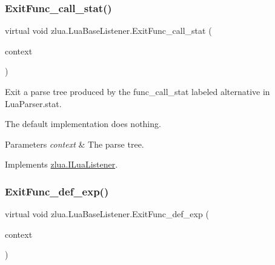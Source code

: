 \subsubsection{\texorpdfstring{Exit\+Func\+\_\+call\+\_\+stat()}{ExitFunc\_call\_stat()}}
{\footnotesize\ttfamily virtual void zlua.\+Lua\+Base\+Listener.\+Exit\+Func\+\_\+call\+\_\+stat (\begin{DoxyParamCaption}\item[{\mbox{[}\+Not\+Null\mbox{]} \mbox{\hyperlink{classzlua_1_1_lua_parser_1_1_func__call__stat_context}{Lua\+Parser.\+Func\+\_\+call\+\_\+stat\+Context}}}]{context }\end{DoxyParamCaption})\hspace{0.3cm}{\ttfamily [virtual]}}



Exit a parse tree produced by the {\ttfamily func\+\_\+call\+\_\+stat} labeled alternative in Lua\+Parser.\+stat. 

The default implementation does nothing.


\begin{DoxyParams}{Parameters}
{\em context} & The parse tree.\\
\hline
\end{DoxyParams}


Implements \mbox{\hyperlink{interfacezlua_1_1_i_lua_listener_ab9aba8c96896e86ec76ca5a87c5d2f25}{zlua.\+I\+Lua\+Listener}}.

\mbox{\label{classzlua_1_1_lua_base_listener_a7826a6c13bab904e4525274152d85550}} 
\subsubsection{\texorpdfstring{Exit\+Func\+\_\+def\+\_\+exp()}{ExitFunc\_def\_exp()}}
{\footnotesize\ttfamily virtual void zlua.\+Lua\+Base\+Listener.\+Exit\+Func\+\_\+def\+\_\+exp (\begin{DoxyParamCaption}\item[{\mbox{[}\+Not\+Null\mbox{]} \mbox{\hyperlink{classzlua_1_1_lua_parser_1_1_func__def__exp_context}{Lua\+Parser.\+Func\+\_\+def\+\_\+exp\+Context}}}]{context }\end{DoxyParamCaption})\hspace{0.3cm}{\ttfamily [virtual]}}



